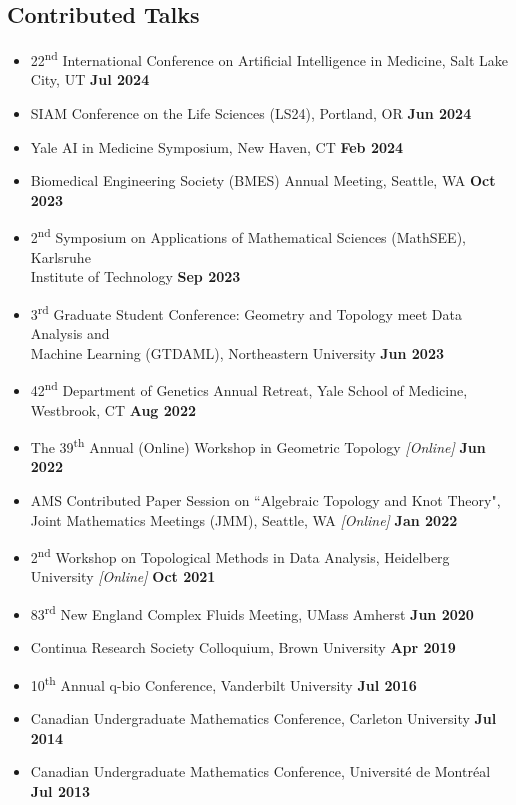 \documentclass[margin,line]{res}
\begin{document}
\begin{resume}
\section{\sc Contributed Talks}
{\renewcommand\leftmargini{0em}
\begin{itemize}
\setlength\itemsep{0.2em}
\item[] 22\textsuperscript{nd} International Conference on Artificial Intelligence in Medicine, Salt Lake City, UT \hfill {\bf \small Jul 2024}
\item[] SIAM Conference on the Life Sciences (LS24), Portland, OR \hfill {\bf \small Jun 2024}
\item[] Yale AI in Medicine Symposium, New Haven, CT \hfill {\bf \small Feb 2024}
\item[] Biomedical Engineering Society (BMES) Annual Meeting, Seattle, WA \hfill {\bf \small Oct 2023}
\item[] 2\textsuperscript{nd} Symposium on Applications of Mathematical Sciences (MathSEE), Karlsruhe \\ Institute of Technology \hfill {\bf \small Sep 2023}
\item[] 3\textsuperscript{rd} Graduate Student Conference: Geometry and Topology meet Data Analysis and \\Machine Learning (GTDAML), Northeastern University \hfill {\bf \small Jun 2023}
\item[] 42\textsuperscript{nd} Department of Genetics Annual Retreat, Yale School of Medicine, Westbrook, CT \hfill {\bf \small Aug 2022}
\item[] The 39\textsuperscript{th} Annual (Online) Workshop in Geometric Topology \textit{[Online]} \hfill {\bf \small Jun 2022}
\item[] AMS Contributed Paper Session on ``Algebraic Topology and Knot Theory", \\Joint Mathematics Meetings (JMM), Seattle, WA \textit{[Online]} \hfill {\bf \small Jan 2022}
\item[] 2\textsuperscript{nd} Workshop on Topological Methods in Data Analysis, Heidelberg University \textit{[Online]} \hfill {\bf \small Oct 2021}
\item[] 83\textsuperscript{rd} New England Complex Fluids Meeting, UMass Amherst \hfill {\bf \small Jun 2020}
\item[] Continua Research Society Colloquium, Brown University \hfill {\bf \small Apr 2019}
\item[] 10\textsuperscript{th} Annual q-bio Conference, Vanderbilt University \hfill {\bf \small Jul 2016}
\item[] Canadian Undergraduate Mathematics Conference, Carleton University \hfill {\bf \small Jul 2014}
\item[] Canadian Undergraduate Mathematics Conference, Universit\'e de Montr\'eal \hfill {\bf \small Jul 2013}
\end{itemize}
}


\end{resume}
\end{document}
